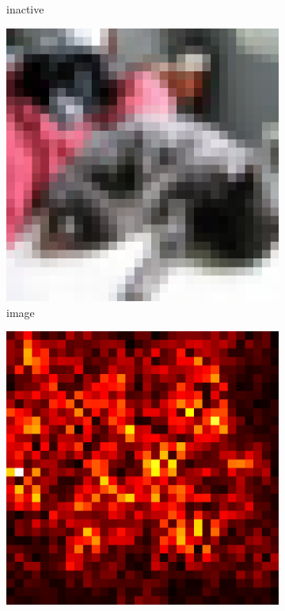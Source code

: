 \documentclass[preprint,12pt]{elsarticle}
\begin{document}
\begin{figure}
\begin{subfigure}{0.14\textwidth}
        \caption{inactive}
    \end{subfigure}
    \hfill
    \begin{subfigure}{0.14\linewidth}
        \centering
        \includegraphics[width=\linewidth]{../visualizations/examples/cifar10/resnet18/images/3.png}
        \caption{image}
    \end{subfigure}
    \hfill
    \begin{subfigure}{0.14\linewidth}
        \centering
        \includegraphics[width=\linewidth]{../visualizations/examples/cifar10/resnet18/saliency_map/3.png}

\end{subfigure}
\end{figure}
\end{document}
